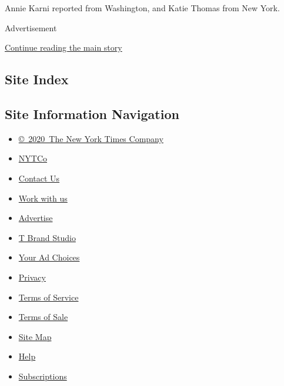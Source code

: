 Annie Karni reported from Washington, and Katie Thomas from New York.

Advertisement

\protect\hyperlink{after-bottom}{Continue reading the main story}

\hypertarget{site-index}{%
\subsection{Site Index}\label{site-index}}

\hypertarget{site-information-navigation}{%
\subsection{Site Information
Navigation}\label{site-information-navigation}}

\begin{itemize}
\tightlist
\item
  \href{https://help.nytimes.com/hc/en-us/articles/115014792127-Copyright-notice}{©~2020~The
  New York Times Company}
\end{itemize}

\begin{itemize}
\tightlist
\item
  \href{https://www.nytco.com/}{NYTCo}
\item
  \href{https://help.nytimes.com/hc/en-us/articles/115015385887-Contact-Us}{Contact
  Us}
\item
  \href{https://www.nytco.com/careers/}{Work with us}
\item
  \href{https://nytmediakit.com/}{Advertise}
\item
  \href{http://www.tbrandstudio.com/}{T Brand Studio}
\item
  \href{https://www.nytimes.com/privacy/cookie-policy\#how-do-i-manage-trackers}{Your
  Ad Choices}
\item
  \href{https://www.nytimes.com/privacy}{Privacy}
\item
  \href{https://help.nytimes.com/hc/en-us/articles/115014893428-Terms-of-service}{Terms
  of Service}
\item
  \href{https://help.nytimes.com/hc/en-us/articles/115014893968-Terms-of-sale}{Terms
  of Sale}
\item
  \href{https://spiderbites.nytimes.com}{Site Map}
\item
  \href{https://help.nytimes.com/hc/en-us}{Help}
\item
  \href{https://www.nytimes.com/subscription?campaignId=37WXW}{Subscriptions}
\end{itemize}
